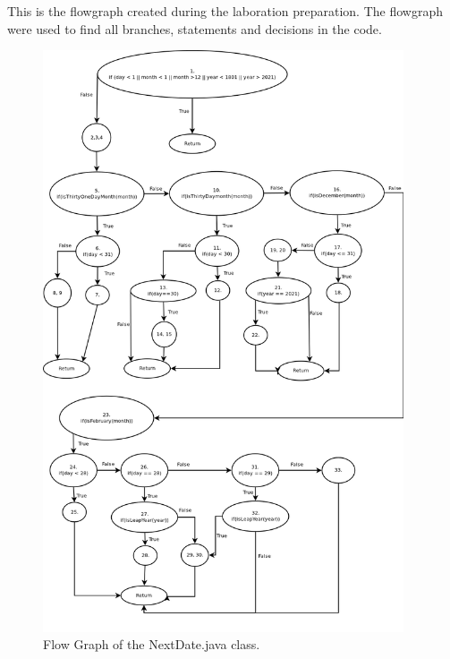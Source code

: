 This is the flowgraph created during the laboration preparation. The flowgraph were used to find all branches, statements and decisions in the code.

\begin{figure}[h!]
\begin{center}
	\includegraphics[width=0.95\textwidth]{flowgraph.png}
\end{center}
\caption{Flow Graph of the NextDate.java class.}
\label{flowgraphpic}
\end{figure}